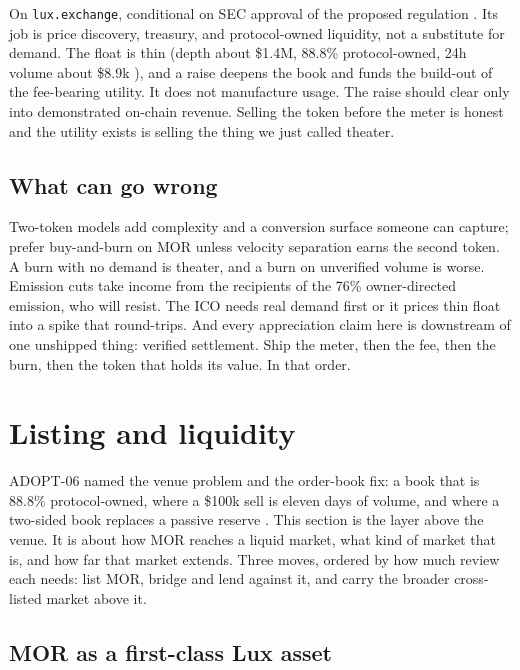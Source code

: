 \documentclass[11pt,a4paper]{article}
\newcommand{\code}[1]{\texttt{\small #1}}
\newcommand{\prov}[1]{{\color{muted}\footnotesize\sffamily[#1]}}
\begin{document}
On \code{lux.exchange}, conditional on SEC approval of the proposed regulation \prov{pending}.
Its job is price discovery, treasury, and protocol-owned liquidity, not a substitute for
demand. The float is thin (depth about \$1.4M, 88.8\% protocol-owned, 24h volume about \$8.9k
\prov{verified}), and a raise deepens the book and funds the build-out of the fee-bearing
utility. It does not manufacture usage. The raise should clear only into demonstrated on-chain
revenue. Selling the token before the meter is honest and the utility exists is selling the
thing we just called theater.

\subsection{What can go wrong}

Two-token models add complexity and a conversion surface someone can capture; prefer
buy-and-burn on MOR unless velocity separation earns the second token. A burn with no demand is
theater, and a burn on unverified volume is worse. Emission cuts take income from the recipients
of the 76\% owner-directed emission, who will resist. The ICO needs real demand first or it
prices thin float into a spike that round-trips. And every appreciation claim here is downstream
of one unshipped thing: verified settlement. Ship the meter, then the fee, then the burn, then
the token that holds its value. In that order.

\section{Listing and liquidity}
\label{sec:listing}

ADOPT-06 named the venue problem and the order-book fix: a book that is 88.8\% protocol-owned,
where a \$100k sell is eleven days of volume, and where a two-sided book replaces a passive
reserve \prov{verified}. This section is the layer above the venue. It is about how MOR reaches a
liquid market, what kind of market that is, and how far that market extends. Three moves, ordered
by how much review each needs: list MOR, bridge and lend against it, and carry the broader
cross-listed market above it.

\subsection{MOR as a first-class Lux asset}
\end{document}
